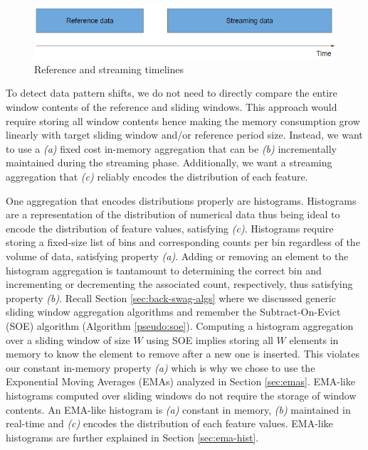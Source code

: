\begin{figure}[!htb]
    \begin{center}
      \includegraphics[scale=0.7]{figures/timeperiods.png}
      \caption[]{Reference and streaming timelines}
      \label{fig:timelines}
    \end{center}
\end{figure}


To detect data pattern shifts, we do not need to directly compare the entire window contents of the reference and sliding windows. This approach would require storing all window contents hence making the memory consumption grow linearly with target sliding window and/or reference period size. Instead, we want to use a \textit{(a)} fixed cost in-memory aggregation that can be \textit{(b)} incrementally maintained during the streaming phase. Additionally, we want a streaming aggregation that \textit{(c)} reliably encodes the distribution of each feature. 

One aggregation that encodes distributions properly are histograms. Histograms are a representation of the distribution of numerical data thus being ideal to encode the distribution of feature values, satisfying \textit{(c)}. Histograms require storing a fixed-size list of bins and corresponding counts per bin regardless of the volume of data, satisfying property \textit{(a)}. Adding or removing an element to the histogram aggregation is tantamount to determining the correct bin and incrementing or decrementing the associated count, respectively, thus satisfying property \textit{(b)}. Recall Section \ref{sec:back-swag-algs} where we discussed generic sliding window aggregation algorithms and remember the Subtract-On-Evict (SOE) algorithm (Algorithm \ref{pseudo:soe}). Computing a histogram aggregation over a sliding window of size $W$ using SOE implies storing all $W$ elements in memory to know the element to remove after a new one is inserted. This violates our constant in-memory property \textit{(a)} which is why we chose to use the Exponential Moving Averages (EMAs) analyzed in Section \ref{sec:emas}. EMA-like histograms computed over sliding windows do not require the storage of window contents. An EMA-like histogram is \textit{(a)} constant in memory, \textit{(b)} maintained in real-time and \textit{(c)} encodes the distribution of each feature values. EMA-like histograms are further explained in Section \ref{sec:ema-hist}.

